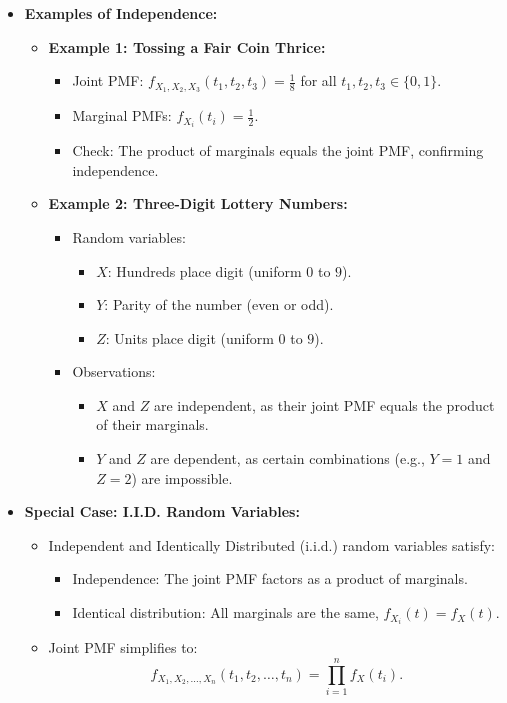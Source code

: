 \documentclass{article}
\begin{document}
\begin{itemize}
  \item \textbf{Examples of Independence:}
    \begin{itemize}
      \item \textbf{Example 1: Tossing a Fair Coin Thrice:}
        \begin{itemize}
          \item Joint PMF: $f_{X_1, X_2, X_3}(t_1, t_2, t_3) = \frac{1}{8}$ for all $t_1, t_2, t_3 \in \{0, 1\}$.
          \item Marginal PMFs: $f_{X_i}(t_i) = \frac{1}{2}$.
          \item Check: The product of marginals equals the joint PMF, confirming independence.
        \end{itemize}
      \item \textbf{Example 2: Three-Digit Lottery Numbers:}
        \begin{itemize}
          \item Random variables:
            \begin{itemize}
              \item $X$: Hundreds place digit (uniform $0$ to $9$).
              \item $Y$: Parity of the number (even or odd).
              \item $Z$: Units place digit (uniform $0$ to $9$).
            \end{itemize}
          \item Observations:
            \begin{itemize}
              \item $X$ and $Z$ are independent, as their joint PMF equals the product of their marginals.
              \item $Y$ and $Z$ are dependent, as certain combinations (e.g., $Y = 1$ and $Z = 2$) are impossible.
            \end{itemize}
        \end{itemize}
    \end{itemize}

  \item \textbf{Special Case: I.I.D. Random Variables:}
    \begin{itemize}
      \item Independent and Identically Distributed (i.i.d.) random variables satisfy:
        \begin{itemize}
          \item Independence: The joint PMF factors as a product of marginals.
          \item Identical distribution: All marginals are the same, $f_{X_i}(t) = f_X(t)$.
        \end{itemize}
      \item Joint PMF simplifies to:
        \[
          f_{X_1, X_2, \dots, X_n}(t_1, t_2, \dots, t_n) = \prod_{i=1}^n f_X(t_i).
        \]
    \end{itemize}


\end{itemize}
\end{document}
